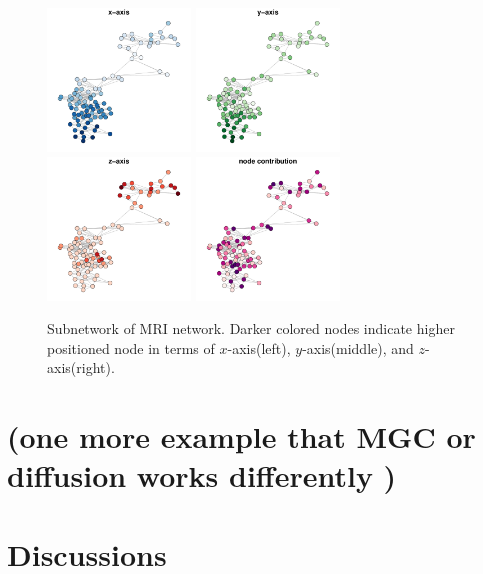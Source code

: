 \documentclass[12pt]{article}
\theoremstyle{definition}
\begin{document}
\begin{figure}[H]
	\centering
		\includegraphics[width=1.5in]{../Figure/brain1_x.pdf}
		\includegraphics[width=1.5in]{../Figure/brain1_y.pdf}
		\includegraphics[width=1.5in]{../Figure/brain1_z.pdf}
		\includegraphics[width=1.5in]{../Figure/brain1_weight.pdf}
	\caption{Subnetwork of MRI network. Darker colored nodes indicate higher positioned node in terms of $x$-axis(left), $y$-axis(middle), and $z$-axis(right).}
		\label{fig:mri}
\end{figure}
	
	
\section{(one more example that MGC or diffusion  works differently )}	
	
\section{Discussions}
\label{sec:discussion}
	
\end{document}
